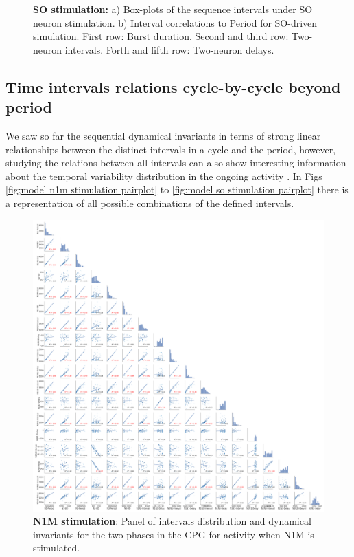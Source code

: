 \begin{figure}[hbt!]
\begin{minipage}[b]{0.53\textwidth}
\begin{minipage}[b]{\textwidth}
		\end{minipage}
	\end{minipage}
	\caption{\textbf{SO stimulation: }a) Box-plots of the sequence intervals under SO neuron stimulation. b) Interval correlations to Period for SO-driven simulation. First row: Burst duration. Second and third row: Two-neuron intervals. Forth and fifth row: Two-neuron delays.}
	\label{fig:invariant so test19}
\end{figure}



\subsection{Time intervals relations cycle-by-cycle beyond period}
We saw so far the sequential dynamical invariants in terms of strong linear relationships between the distinct intervals in a cycle and the period, however, studying the relations between all intervals can also show interesting information about the temporal variability distribution in the ongoing activity \cite{}. In Figs \ref{fig;model n1m stimulation pairplot} to \ref{fig:model so stimulation pairplot} there is a representation of all possible combinations of the defined intervals. 



\begin{figure}[htbp]
	\centering
	\includegraphics[width=\textwidth]{./invariants/data/MODEL/n1m_driven/images/3phases/_output_pairplot.png}
	\caption{\textbf{N1M stimulation}: Panel of intervals distribution and dynamical invariants for the two phases in the CPG for activity when N1M is stimulated.}
	\label{fig:model n1m stimulation pairplot}
\end{figure}
 

